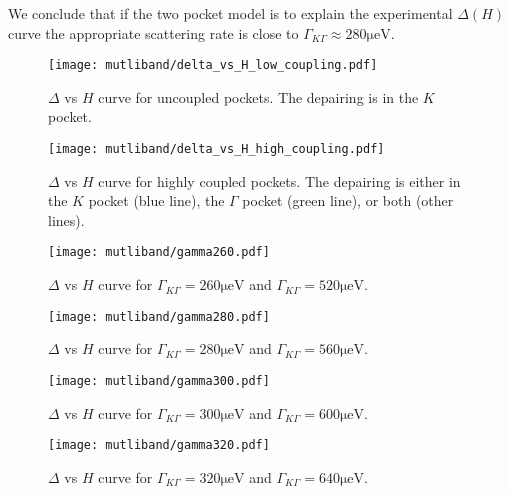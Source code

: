 \documentclass[showpacs,superscriptaddress,onecolumn,prb]{revtex4}
\begin{document}
We conclude that if the two pocket model is to explain the experimental $\Delta(H)$ curve the appropriate scattering rate is close to $\Gamma_{K\Gamma}\approx280\mathrm{\mu eV}$.

\begin{figure}[!htb]
	\centering
	\begin{minipage}{.48\textwidth}
		\centering
		\vspace*{-4mm}
		\texttt{[image: mutliband/delta\_vs\_H\_low\_coupling.pdf]}
		\caption{$\Delta$ vs $H$ curve for uncoupled pockets. The depairing is in the $K$ pocket.}
		\label{fig:deltaH_low}
	\end{minipage}%
	\begin{minipage}{0.48\textwidth}
		\centering
		\texttt{[image: mutliband/delta\_vs\_H\_high\_coupling.pdf]}
		\caption{$\Delta$ vs $H$ curve for highly coupled pockets. The depairing is either in the $K$ pocket (blue line), the $\Gamma$ pocket (green line), or both (other lines).}
		\label{fig:deltaH_high}
	\end{minipage}
\end{figure}

\begin{figure}[!htb]
	\centering
	\begin{minipage}{.48\textwidth}
		\centering
		\texttt{[image: mutliband/gamma260.pdf]}
		\caption{$\Delta$ vs $H$ curve for $\Gamma_{K\Gamma}=260\mathrm{\mu eV}$ and $\Gamma_{K\Gamma}=520\mathrm{\mu eV}$.}
		\label{fig:gamma260}
	\end{minipage}%
	\begin{minipage}{0.48\textwidth}
		\centering
		\texttt{[image: mutliband/gamma280.pdf]}
		\caption{$\Delta$ vs $H$ curve for $\Gamma_{K\Gamma}=280\mathrm{\mu eV}$ and $\Gamma_{K\Gamma}=560\mathrm{\mu eV}$.}
		\label{fig:gamma280}
	\end{minipage}
\end{figure}


\begin{figure}[!htb]
	\centering
	\begin{minipage}{.48\textwidth}
		\centering
		\texttt{[image: mutliband/gamma300.pdf]}
		\caption{$\Delta$ vs $H$ curve for $\Gamma_{K\Gamma}=300\mathrm{\mu eV}$ and $\Gamma_{K\Gamma}=600\mathrm{\mu eV}$.}
		\label{fig:gamma300}
	\end{minipage}%
	\begin{minipage}{0.48\textwidth}
		\centering
		\texttt{[image: mutliband/gamma320.pdf]}
		\caption{$\Delta$ vs $H$ curve for $\Gamma_{K\Gamma}=320\mathrm{\mu eV}$ and $\Gamma_{K\Gamma}=640\mathrm{\mu eV}$.}
		\label{fig:gamma320}
	\end{minipage}
\end{figure}
\end{document}
